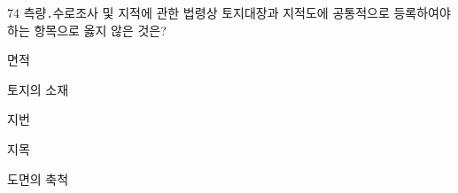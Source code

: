 \begin{question}{74}
측량․수로조사 및 지적에 관한 법령상 토지대장과 지적도에 공통적으로 등록하여야 하는 항목으로 옳지 않은 것은?
\begin{choices}
  \item 면적
  \item 토지의 소재
  \item 지번
  \item 지목
  \item 도면의 축척
\end{choices}
\end{question}
